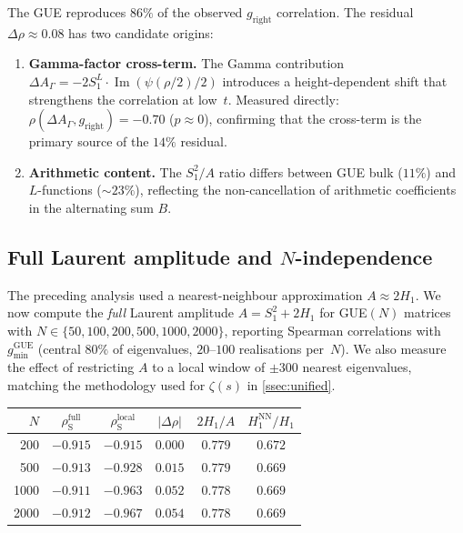 \documentclass[11pt,a4paper]{article}
\theoremstyle{plain}
\theoremstyle{definition}
\DeclareMathOperator{\GUE}{GUE}
\begin{document}
The GUE reproduces $86\%$ of the observed $g_{\mathrm{right}}$
correlation.  The residual $\Delta\rho \approx 0.08$ has two
candidate origins:

\begin{enumerate}
  \item \textbf{Gamma-factor cross-term.}\;
        The Gamma contribution
        $\Delta A_\Gamma = -2 S_1^L \cdot \operatorname{Im}(\psi(\rho/2)/2)$
        introduces a height-dependent shift that strengthens the
        correlation at low~$t$.  Measured directly:
        $\rho(\Delta A_\Gamma, g_{\mathrm{right}}) = -0.70$
        ($p \approx 0$), confirming that the cross-term is the
        primary source of the $14\%$ residual.
  \item \textbf{Arithmetic content.}\;
        The $S_1^2/A$ ratio differs between GUE bulk ($11\%$) and
        $L$-functions (${\sim}23\%$), reflecting the non-cancellation
        of arithmetic coefficients in the alternating sum $B$.
\end{enumerate}

\subsection{Full Laurent amplitude and $N$-independence}
\label{ssec:gue-full}

The preceding analysis used a nearest-neighbour approximation
$A \approx 2H_1$.  We now compute the \emph{full} Laurent amplitude
$A = S_1^2 + 2H_1$ for GUE$(N)$ matrices with
$N \in \{50,100,200,500,1000,2000\}$,
reporting Spearman correlations with
$g_{\min}^{\GUE}$ (central $80\%$ of eigenvalues, $20$--$100$
realisations per~$N$).  We also measure the effect of restricting $A$
to a local window of $\pm 300$ nearest eigenvalues, matching the
methodology used for $\zeta(s)$ in \cref{ssec:unified}.

\begin{center}
\begin{tabular}{rccccc}
\toprule
$N$ & $\rho_{\mathrm{S}}^{\text{full}}$ & $\rho_{\mathrm{S}}^{\text{local}}$
    & $|\Delta\rho|$ & $2H_1/A$ & $H_1^{\mathrm{NN}}/H_1$ \\
\midrule
200  & $-0.915$ & $-0.915$ & $0.000$ & $0.779$ & $0.672$ \\
500  & $-0.913$ & $-0.928$ & $0.015$ & $0.779$ & $0.669$ \\
1000 & $-0.911$ & $-0.963$ & $0.052$ & $0.778$ & $0.669$ \\
2000 & $-0.912$ & $-0.967$ & $0.054$ & $0.778$ & $0.669$ \\
\bottomrule
\end{tabular}
\end{center}
\end{document}

